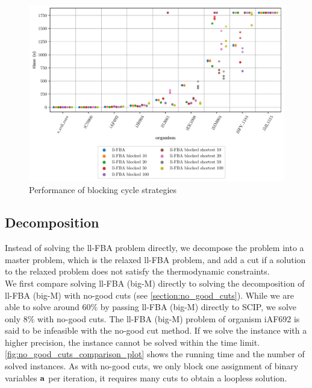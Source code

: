 \begin{figure}[h!]
    \centering
    \includegraphics[width=1.0\textwidth]{Images/cff_comparison_boxplot.pdf}
    \caption{Performance of blocking cycle strategies}
    \label{fig:cff_comparison}
\end{figure}

\newpage
\subsection{Decomposition} \label{section:results_cuts}
Instead of solving the \textsf{ll-FBA} problem directly, we decompose the problem into a master problem, which is the relaxed \textsf{ll-FBA} problem, and add a cut if a solution to the relaxed problem does not satisfy the thermodynamic constraints.\\
We first compare solving \textsf{ll-FBA (big-M)} directly to solving the decomposition of \textsf{ll-FBA (big-M)} with no-good cuts (see \cref{section:no_good_cuts}). While we are able to solve around $60\%$ by passing \textsf{ll-FBA (big-M)} directly to \textsf{SCIP}, we solve only $8\%$ with no-good cuts. The \textsf{ll-FBA (big-M)} problem of organism \textsf{iAF692} is said to be infeasible with the no-good cut method. If we solve the instance with a higher precision, the instance cannot be solved within the time limit. \cref{fig:no_good_cuts_comparison_plot} shows the running time and the number of solved instances.
As with no-good cuts, we only block one assignment of binary variables $\bold a$ per iteration, it requires many cuts to obtain a loopless solution.

